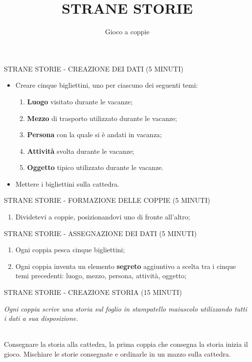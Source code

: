 \documentclass[aspectratio=1610]{beamer}
\title{STRANE STORIE}
\subtitle{Gioco a coppie}
\date{}
\institute{Materiale necessario: cinque bigliettini e una penna a testa, un foglio per ciascuna coppia.}
\begin{document}
\begin{frame}
    \titlepage
\end{frame}

\begin{frame}{STRANE STORIE - CREAZIONE DEI DATI (5 MINUTI) }
    \begin{itemize}
        \item Creare cinque bigliettini, uno per ciascuno dei seguenti temi:
              \begin{enumerate}
                  \item \textbf{Luogo} visitato durante le vacanze;
                  \item \textbf{Mezzo} di trasporto utilizzato durante le vacanze;
                  \item \textbf{Persona} con la quale si è andati in vacanza;
                  \item \textbf{Attività} svolta durante le vacanze;
                  \item \textbf{Oggetto} tipico utilizzato durante le vacanze.
              \end{enumerate}
        \pause
        \item Mettere i bigliettini sulla cattedra.
    \end{itemize}
\end{frame}

\begin{frame}{STRANE STORIE - FORMAZIONE DELLE COPPIE (5 MINUTI)}
    \begin{enumerate}
        \item Dividetevi a coppie, posizionandovi uno di fronte all'altro;
    \end{enumerate}
\end{frame}

\begin{frame}{STRANE STORIE - ASSEGNAZIONE DEI DATI (5 MINUTI)} 
    \begin{enumerate}
        \item Ogni coppia pesca cinque bigliettini;
        \pause
        \item Ogni coppia inventa un elemento \textbf{segreto} aggiuntivo a scelta tra i cinque temi precedenti: luogo, mezzo, persona, attività, oggetto;
    \end{enumerate}
\end{frame}

\begin{frame}{STRANE STORIE - CREAZIONE STORIA (15 MINUTI)}
    \begin{minipage}{0.98\linewidth}
        \centering
        \huge
        \textit{Ogni coppia scrive una storia sul foglio in stampatello maiuscolo 
        utilizzando tutti i dati a sua disposizione.}\\
    \end{minipage}\\
    \bigskip
    \pause
    Consegnare la storia alla cattedra, la prima coppia che consegna la storia inizia il gioco.
    \pause
    Mischiare le storie consegnate e ordinarle in un mazzo sulla cattedra.
    
\end{frame}
\end{document}
